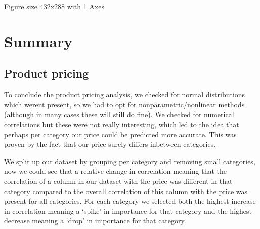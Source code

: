 \documentclass[letterpaper,10pt,english]{jupyterBook}
\begin{document}
\begin{sphinxVerbatim}[commandchars=\\\{\}]
                         
                       
                     
\end{sphinxVerbatim}

\begin{sphinxVerbatim}[commandchars=\\\{\}]
\PYGZlt{}Figure size 432x288 with 1 Axes\PYGZgt{}
\end{sphinxVerbatim}


\section{Summary}
\label{\detokenize{c7_case_studies/Olist:summary}}

\subsection{Product pricing}
\label{\detokenize{c7_case_studies/Olist:id8}}
\sphinxAtStartPar
To conclude the product pricing analysis, we checked for normal distributions which werent present, so we had to opt for non\sphinxhyphen{}parametric/non\sphinxhyphen{}linear methods (although in many cases these will still do fine). We checked for numerical correlations but these were not really interesting, which led to the idea that perhaps per category our price could be predicted more accurate. This was proven by the fact that our price surely differs inbetween categories.

\sphinxAtStartPar
We split up our dataset by grouping per category and removing small categories, now we could see that a relative change in correlation \sphinxhyphen{} meaning that the correlation of a column in our dataset with the price was different in that category compared to the overall correlation of this column with the price \sphinxhyphen{} was present for all categories. For each category we selected both the highest increase in correlation \sphinxhyphen{} meaning a ‘spike’ in importance \sphinxhyphen{} for that category and the highest decrease \sphinxhyphen{} meaning a ‘drop’ in importance \sphinxhyphen{} for that category.
\end{document}
